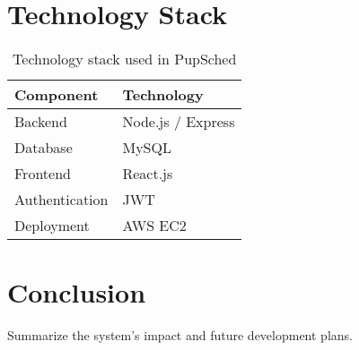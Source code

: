 \documentclass[12pt,a4paper]{article}
\begin{document}
\section{Technology Stack}
\begin{table}[h]
    \centering
    \begin{tabular}{ll}
        \toprule
        \textbf{Component} & \textbf{Technology} \\
        \midrule
        Backend & Node.js / Express \\
        Database & MySQL \\
        Frontend & React.js \\
        Authentication & JWT \\
        Deployment & AWS EC2 \\
        \bottomrule
    \end{tabular}
    \caption{Technology stack used in PupSched}
    \label{tab:stack}
\end{table}

\section{Conclusion}
Summarize the system’s impact and future development plans.
\end{document}
